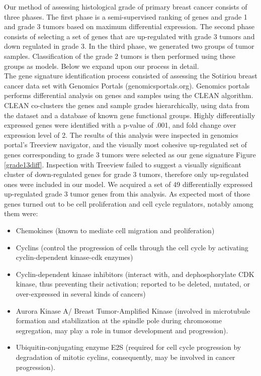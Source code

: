\documentclass[a4paper,10pt]{article}
\begin{document}
Our method of assessing histological grade of primary breast cancer consists of three phases. The first phase is
a semi-supervised ranking of genes and grade 1 and grade 3 tumors based on maximum differential
expression. The second phase consists of selecting a set of genes that are up-regulated with 
grade 3 tumors and down regulated in grade 3. In the third phase, we generated two groups of tumor samples.
Classification of the grade 2 tumors is then performed using these groups as models. Below we expand upon
our process in detail.\\
The gene signature identification process consisted of assessing the Sotiriou breast cancer data set with Genomics Portals (genomicsportals.org).
Genomics portals performs differential analysis on genes and samples using the CLEAN algorithm\cite{CLEAN}. 
CLEAN co-clusters
the genes and sample grades hierarchically, using data from the dataset and a database of known gene functional groups. Highly differentially
expressed genes were identified with a p-value of .001, and fold change over expression level of 2. The results of this analysis
were inspected in genomics portal's Treeview navigator\cite{Treeview}, and the visually most cohesive up-regulated set of genes
corresponding to grade 3 tumors were selected as our gene signature Figure \ref{grade13diff}. 
Inspection with Treeview failed to suggest a 
visually significant cluster of down-regulated genes for grade 3 tumors, therefore only up-regulated ones were included in our model. 
We acquired a set of 49 differentially expressed up-regulated grade 3 tumor genes from this analysis.
As expected most of those genes turned out to be cell proliferation and cell cycle regulators, notably among them were:
\begin{itemize}
\item Chemokines (known to mediate cell migration and proliferation)
\item Cyclins (control the progression of cells through the cell cycle by activating cyclin-dependent kinase-cdk enzymes)
\item Cyclin-dependent kinase inhibitors  (interact with, and dephosphorylate CDK kinase,  thus preventing their activation; reported to be deleted, mutated, or over-expressed in several kinds of cancers)
\item Aurora Kinase A/ Breast Tumor-Amplified Kinase (involved in microtubule formation and stabilization at the spindle pole during chromosome segregation, may play a role  in tumor development and progression).
\item Ubiquitin-conjugating enzyme E2S (required for cell cycle progression by degradation of mitotic cyclins, consequently, may be involved in cancer progression).
\end{itemize}
\end{document}
